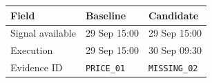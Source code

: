 \begin{tabular}{@{}P{3.7cm}P{4.3cm}P{4.3cm}@{}}
\toprule
\textbf{Field} & \textbf{Baseline} & \textbf{Candidate} \\
\midrule
Signal available & 29 Sep 15:00 & 29 Sep 15:00 \\
Execution & 29 Sep 15:00 & 30 Sep 09:30 \\
Evidence ID & \texttt{PRICE\_01} & \texttt{MISSING\_02} \\
\bottomrule
\end{tabular}
